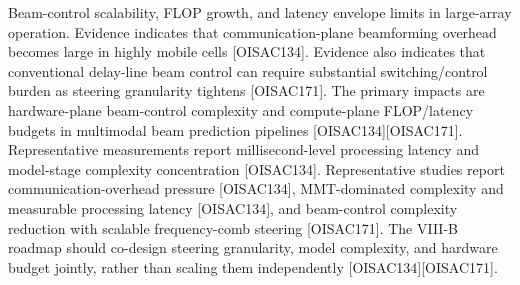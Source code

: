 \markdownRendererOlEnd \markdownRendererInterblockSeparator
{}
\markdownRendererSectionEnd \markdownRendererSectionBegin
{}\markdownRendererInterblockSeparator
{}\markdownRendererOlBegin
{} Beam-control scalability, FLOP growth, and latency envelope limits in large-array operation.\markdownRendererOlItemEnd 
{} Evidence indicates that communication-plane beamforming overhead becomes large in highly mobile cells [O\markdownRendererUnderscore{}ISAC\markdownRendererUnderscore{}134]. Evidence also indicates that conventional delay-line beam control can require substantial switching/control burden as steering granularity tightens [O\markdownRendererUnderscore{}ISAC\markdownRendererUnderscore{}171].\markdownRendererOlItemEnd 
{} The primary impacts are hardware-plane beam-control complexity and compute-plane FLOP/latency budgets in multimodal beam prediction pipelines [O\markdownRendererUnderscore{}ISAC\markdownRendererUnderscore{}134][O\markdownRendererUnderscore{}ISAC\markdownRendererUnderscore{}171]. Representative measurements report millisecond-level processing latency and model-stage complexity concentration [O\markdownRendererUnderscore{}ISAC\markdownRendererUnderscore{}134].\markdownRendererOlItemEnd 
{} Representative studies report communication-overhead pressure [O\markdownRendererUnderscore{}ISAC\markdownRendererUnderscore{}134], MMT-dominated complexity and measurable processing latency [O\markdownRendererUnderscore{}ISAC\markdownRendererUnderscore{}134], and beam-control complexity reduction with scalable frequency-comb steering [O\markdownRendererUnderscore{}ISAC\markdownRendererUnderscore{}171].\markdownRendererOlItemEnd 
{} The VIII-B roadmap should co-design steering granularity, model complexity, and hardware budget jointly, rather than scaling them independently [O\markdownRendererUnderscore{}ISAC\markdownRendererUnderscore{}134][O\markdownRendererUnderscore{}ISAC\markdownRendererUnderscore{}171].\markdownRendererOlItemEnd 
